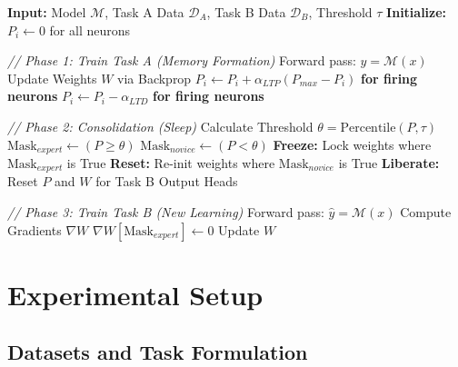 \documentclass[5p,times]{elsarticle}
\begin{document}
\begin{algorithm}[H] %
\caption{P-Factor Consolidation for Continual Learning}
\begin{algorithmic}[1]
\STATE \textbf{Input:} Model $\mathcal{M}$, Task A Data $\mathcal{D}_A$, Task B Data $\mathcal{D}_B$, Threshold $\tau$
\STATE \textbf{Initialize:} $P_i \leftarrow 0$ for all neurons

\STATE \textit{// Phase 1: Train Task A (Memory Formation)}
        \STATE Forward pass: $\hat{y} = \mathcal{M}(x)$
        \STATE Update Weights $W$ via Backprop
            \STATE $P_i \leftarrow P_i + \alpha_{LTP}(P_{max} - P_i)$ \textbf{for firing neurons}
        \ELSE
            \STATE $P_i \leftarrow P_i - \alpha_{LTD}$ \textbf{for firing neurons}
        \ENDIF
    \ENDFOR
\ENDFOR

\STATE \textit{// Phase 2: Consolidation (Sleep)}
\STATE Calculate Threshold $\theta = \text{Percentile}(P, \tau)$
\STATE $\text{Mask}_{expert} \leftarrow (P \geq \theta)$
\STATE $\text{Mask}_{novice} \leftarrow (P < \theta)$
\STATE \textbf{Freeze:} Lock weights where $\text{Mask}_{expert}$ is True
\STATE \textbf{Reset:} Re-init weights where $\text{Mask}_{novice}$ is True
\STATE \textbf{Liberate:} Reset $P$ and $W$ for Task B Output Heads

\STATE \textit{// Phase 3: Train Task B (New Learning)}
        \STATE Forward pass: $\hat{y} = \mathcal{M}(x)$
        \STATE Compute Gradients $\nabla W$
        \STATE $\nabla W[\text{Mask}_{expert}] \leftarrow 0$ 
        \STATE Update $W$
    \ENDFOR
\ENDFOR
\end{algorithmic}
\end{algorithm}

\section{Experimental Setup}

\subsection{Datasets and Task Formulation}
\end{document}
